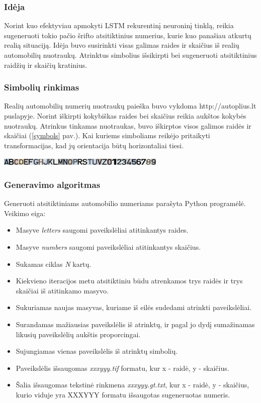 \documentclass{VUMIFInfBakalaurinis}
\begin{document}
\subsubsection{Idėja}
Norint kuo efektyviau apmokyti LSTM rekurentinį neuroninį tinklą, reikia sugeneruoti tokio pačio šrifto atsitiktinius numerius, kurie kuo panašiau atkurtų realią situaciją. 
Idėja buvo susirinkti visas galimas raides ir skaičius iš realių automobilių nuotraukų. Atrinktus simbolius išsikirpti bei sugeneruoti atsitiktinius raidžių ir skaičių kratinius.

\subsubsection{Simbolių rinkimas}
Realių automobilių numerių nuotraukų paieška buvo vykdoma http://autoplius.lt puslapyje.
Norint iškirpti kokybiškas raides bei skaičius reikia aukštos kokybės nuotraukų. 
Atrinkus tinkamas nuotraukas, buvo iškirptos visos galimos raidės ir skaičiai (\ref{symbols} pav.).
Kai kuriems simboliams reikėjo pritaikyti transformacijas, kad jų orientacija būtų horizontaliai tiesi.

\begin{minipage}{\linewidth}
  \includegraphics[width=8cm]{symbols.jpg}
  \label{symbols}
\end{minipage}

\subsubsection{Generavimo algoritmas}
Generuoti atsitiktiniams automobilio numeriams parašyta Python programėlė.
Veikimo eiga:
\begin{itemize}
  \item Masyve \textit{letters} saugomi paveikslėliai atitinkantys raides.
  \item Masyve \textit{numbers} saugomi paveikslėliai atitinkantys skaičius.
  \item Sukamas ciklas \textit{N} kartų.
  \item Kiekvieno iteracijos metu atsitiktiniu būdu atrenkamos trys raidės ir trys skaičiai iš atitinkamo masyvo.
  \item Sukuriamas naujas masyvas, kuriame iš eilės sudedami atrinkti paveikslėliai.
  \item Surandamas mažiausias paveikslėlis iš atrinktų, ir pagal jo dydį sumažinamas likusių paveikslėlių aukštis proporcingai.
  \item Sujungiamas vienas paveikslėlis iš atrinktų simbolių.
  \item Paveikslėlis išsaugomas \textit{xxxyyy.tif} formatu, kur x - raidė, y - skaičius.
  \item Šalia išsaugomas tekstinė rinkmena \textit{xxxyyy.gt.txt}, kur x - raidė, y - skaičius, kurio viduje yra XXXYYY formatu išsaugotas sugeneruotas numeris.
\end{itemize}
\end{document}
